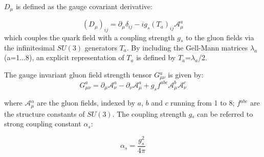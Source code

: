 \documentclass[UTF8,12pt]{ctexart}
\numberwithin{equation}{section}
\begin{document}
$D$$_{\mu}$ is defined as the gauge covariant derivative:

\begin{equation}
\left(D_{\mu}\right)_{i j}=\partial_{\mu} \delta_{i j}-i g_s\left(T_{a}\right)_{i j} \mathcal{A}_{\mu}^{a}
\end{equation}
which couples the quark field with a coupling strength $g$$_s$ to the gluon fields via the infinitesimal $SU(3)$ generators $T$$_{a}$. By including the Gell-Mann matrices $\lambda _{a}$ (a=1...8), an explicit representation of $T$$_{a}$ is defined by $T$$_{a}$=$\lambda _{a}$/2.

The gauge invariant gluon field strength tensor $G$$_{\mu \nu}^{a}$ is given by:
\begin{equation}
G_{\mu \nu}^{a}=\partial_{\mu} \mathcal{A}_{\nu}^{a}-\partial_{\nu} \mathcal{A}_{\mu}^{a}+g_s f^{a b c} \mathcal{A}_{\mu}^{b} \mathcal{A}_{\nu}^{c}
\end{equation}

where $\mathcal{A}$$_{\mu}^{\alpha}$ are the gluon fields, indexed by $a$, $b$ and $c$ running from 1 to 8; $f$$^{a b c}$ are the structure constants of $SU(3)$. The coupling strength $g$$_s$ can be referred to strong coupling constant $\alpha_{s}$:

\begin{equation}
\alpha_{s}=\frac{g_{s}^{2}}{4 \pi}
\end{equation}
\end{document}
